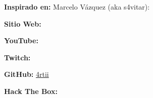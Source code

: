 \documentclass[a4paper]{article} %
\begin{document}
        \textbf{Inspirado en:} Marcelo Vázquez (aka s4vitar): \href{https://youtube.com/watch?v=riNRHoEOBeU}{\color{blue}{Cómo crear un reporte profesional en LaTeX}}
        
        \textbf{Sitio Web:} \href{https://4rtii.github.io}{\color{blue}{4rtii.github.io}}
        
        \textbf{YouTube:} \href{https://youtube.com/channel/UCGKbBeqGX7AgHH4RNCPcbZw}{\color{blue}{4rtii}}
        
        \textbf{Twitch:} \href{https://twitch.tv/4rtii_}{\color{blue}{4rtii_}}
        
        \textbf{GitHub:} \href{https://github.com/4rtii}{\color{blue}4rtii}
        
        \textbf{Hack The Box:} \href{https://app.hackthebox.com/profile/839583}{\color{blue}{4rtii}}
        
\end{document}
